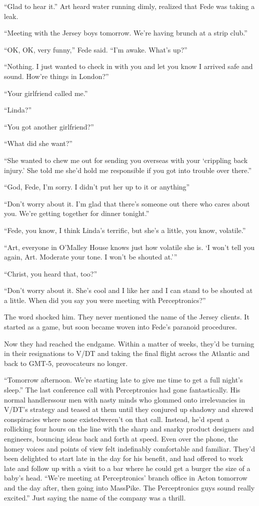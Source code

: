 “Glad to hear it.” Art heard water running dimly, realized that
Fede was taking a leak.

“Meeting with the Jersey boys tomorrow. We’re having brunch at a
strip club.”

“OK, OK, very funny,” Fede said. “I’m awake. What’s up?”

“Nothing. I just wanted to check in with you and let you know I
arrived safe and sound. How’re things in London?”

“Your girlfriend called me.”

“Linda?”

“You got another girlfriend?”

“What did she want?”

“She wanted to chew me out for sending you overseas with your
‘crippling back injury.’ She told me she’d hold me responsible if
you got into trouble over there.”

“God, Fede, I’m sorry. I didn’t put her up to it or anything{\dash}”

“Don’t worry about it. I’m glad that there’s someone out there who
cares about you. We’re getting together for dinner tonight.”

“Fede, you know, I think Linda’s terrific, but she’s a little, you
know, volatile.”

“Art, everyone in O’Malley House knows just how volatile she is. ‘I
won’t tell you again, Art. Moderate your tone. I won’t be shouted
at.’”

“Christ, you heard that, too?”

“Don’t worry about it. She’s cool and I like her and I can stand to
be shouted at a little. When did you say you were meeting with
Perceptronics?”

The word shocked him. They never mentioned the name of the Jersey
clients. It started as a game, but soon became woven into Fede’s
paranoid procedures.

Now they had reached the endgame. Within a matter of weeks, they’d
be turning in their resignations to V/DT and taking the final
flight across the Atlantic and back to GMT-5, provocateurs no
longer.

“Tomorrow afternoon. We’re starting late to give me time to get a
full night’s sleep.” The last conference call with Perceptronics
had gone fantastically. His normal handlers{\dash}sour men with nasty
minds who glommed onto irrelevancies in V/DT’s strategy and teased
at them until they conjured up shadowy and shrewd conspiracies
where none existed{\dash}weren’t on that call. Instead, he’d spent a
rollicking four hours on the line with the sharp and snarky product
designers and engineers, bouncing ideas back and forth at speed.
Even over the phone, the homey voices and points of view felt
indefinably comfortable and familiar. They’d been delighted to
start late in the day for his benefit, and had offered to work late
and follow up with a visit to a bar where he could get a burger the
size of a baby’s head. “We’re meeting at Perceptronics’ branch
office in Acton tomorrow and the day after, then going into
MassPike. The Perceptronics guys sound really excited.” Just saying
the name of the company was a thrill.

